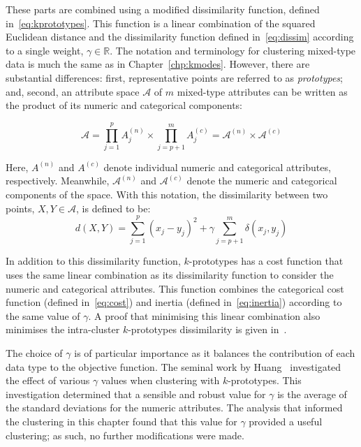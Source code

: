 These parts are combined using a modified dissimilarity function, defined
in~\eqref{eq:kprototypes}. This function is a linear combination of the squared
Euclidean distance and the dissimilarity function defined in~\eqref{eq:dissim}
according to a single weight, \(\gamma \in \mathbb R\). The notation and
terminology for clustering mixed-type data is much the same as in
Chapter~\ref{chp:kmodes}. However, there are substantial differences: first,
representative points are referred to as \emph{prototypes}; and, second, an
attribute space \(\mathcal A\) of \(m\) mixed-type attributes can be written as
the product of its numeric and categorical components:

\begin{equation}
    \mathcal A
    = \prod_{j=1}^{p} A^{(n)}_j \times \prod_{j=p+1}^{m} A^{(c)}_j
    = \mathcal A^{(n)} \times \mathcal A^{(c)}
\end{equation}

Here, \(A^{(n)}\) and \(A^{(c)}\) denote individual numeric and categorical
attributes, respectively. Meanwhile, \(\mathcal A^{(n)}\) and \(\mathcal
A^{(c)}\) denote the numeric and categorical components of the space. With this
notation, the dissimilarity between two points, \(X, Y \in \mathcal A\), is
defined to be:
\begin{equation}\label{eq:kprototypes}
    d(X, Y) = \sum_{j=1}^{p} \left(x_j - y_j\right)^2 + \gamma \sum_{j=p+1}^{m}
    \delta \left(x_j, y_j\right)
\end{equation}



In addition to this dissimilarity function, \(k\)-prototypes has a cost function
that uses the same linear combination as its dissimilarity function to consider
the numeric and categorical attributes. This function combines the categorical
cost function (defined in~\eqref{eq:cost}) and inertia (defined
in~\eqref{eq:inertia}) according to the same value of \(\gamma\). A proof that
minimising this linear combination also minimises the intra-cluster
\(k\)-prototypes dissimilarity is given in~\cite{Huang1997a}.

The choice of \(\gamma\) is of particular importance as it balances the
contribution of each data type to the objective function. The seminal work by
Huang~\cite{Huang1997a} investigated the effect of various \(\gamma\) values
when clustering with \(k\)-prototypes. This investigation determined that a
sensible and robust value for \(\gamma\) is the average of the standard
deviations for the numeric attributes. The analysis that informed the clustering
in this chapter found that this value for \(\gamma\) provided a useful
clustering; as such, no further modifications were made.

